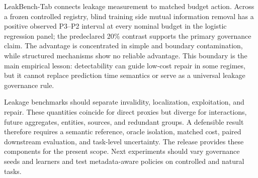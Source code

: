 \documentclass[sigconf,review]{acmart}
\begin{document}
LeakBench-Tab connects leakage measurement to matched budget action. Across a
frozen controlled registry, blind training side mutual information removal
has a positive observed P3--P2 interval at every nominal budget in the logistic
regression panel; the predeclared 20\% contrast supports the primary governance
claim. The advantage is concentrated in simple and boundary contamination,
while structured mechanisms show no reliable advantage. This boundary is the
main empirical lesson: detectability can guide low-cost repair in some regimes,
but it cannot replace prediction time semantics or serve as a universal leakage
governance rule.

Leakage benchmarks should separate invalidity, localization, exploitation, and
repair. These quantities coincide for direct proxies but diverge for
interactions, future aggregates, entities, sources, and redundant groups. A
defensible result therefore requires a semantic reference, oracle isolation,
matched cost, paired downstream evaluation, and task-level uncertainty. The
release provides these components for the present scope. Next experiments should
vary governance seeds and learners and test metadata-aware policies on controlled
and natural tasks.

\balance


\end{document}
